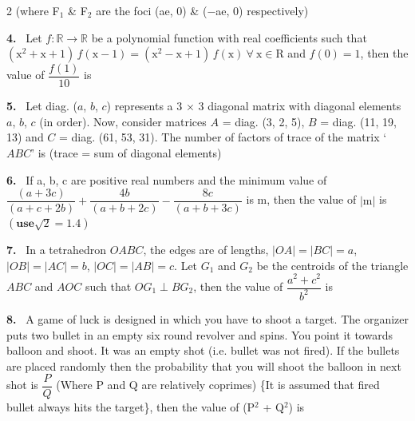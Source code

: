 \documentclass[10pt]{extarticle}
\newcommand{\qn}[1]{\par\smallskip\noindent\textbf{#1.}~}
\begin{document}
\begin{multicols}{2}
(where F$_1$ \& F$_2$ are the foci (ae, 0) \& ($-$ae, 0) respectively)
\qn{4} Let $f:\mathbb R\to\mathbb R$ be a polynomial function with real coefficients such that $(\mathrm x^2+\mathrm x+1)\,f(\mathrm x-1)=(\mathrm x^2-\mathrm x+1)\,f(\mathrm x)\ \forall\ \mathrm x\in\mathrm R$ and $f(0)=1$, then the value of $\dfrac{f(1)}{10}$ is
\qn{5} Let diag. ($a$, $b$, $c$) represents a 3 $\times$ 3 diagonal matrix with diagonal elements $a$, $b$, $c$ (in order). Now, consider matrices $A$ = diag. (3, 2, 5), $B$ = diag. (11, 19, 13) and $C$ = diag. (61, 53, 31). The number of factors of trace of the matrix `$ABC$' is (trace = sum of diagonal elements)
\qn{6} If a, b, c are positive real numbers and the minimum value of $\dfrac{(a+3c)}{(a+c+2b)}+\dfrac{4b}{(a+b+2c)}-\dfrac{8c}{(a+b+3c)}$ is m, then the value of $|\mathrm m|$ is $\left(\textbf{use}\sqrt2=\mathbf{1.4}\right)$
\qn{7} In a tetrahedron $OABC$, the edges are of lengths, $|OA|=|BC|=a$, $|OB|=|AC|=b$, $|OC|=|AB|=c$. Let $G_1$ and $G_2$ be the centroids of the triangle $ABC$ and $AOC$ such that $OG_1\perp BG_2$, then the value of $\dfrac{a^2+c^2}{b^2}$ is
\qn{8} A game of luck is designed in which you have to shoot a target. The organizer puts two bullet in an empty six round revolver and spins. You point it towards balloon and shoot. It was an empty shot (i.e. bullet was not fired). If the bullets are placed randomly then the probability that you will shoot the balloon in next shot is $\dfrac PQ$ (Where P and Q are relatively coprimes) \{It is assumed that fired bullet always hits the target\}, then the value of (P$^2$ + Q$^2$) is
\end{multicols}
\end{document}
